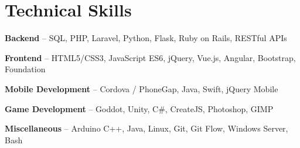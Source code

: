 \section{Technical Skills}
\begin{small}
	\parbox[t][][t]{\linewidth}{
		\textbf{Backend} -- SQL, PHP, Laravel, Python, Flask, Ruby on Rails, RESTful APIs
		\smallbreak
	}
	\parbox[t][][t]{\linewidth}{
	\textbf{Frontend} -- HTML5/CSS3, JavaScript ES6, jQuery, Vue.js, Angular, Bootstrap, Foundation
	\smallbreak
}
	\parbox[t][][t]{\linewidth}{
		\textbf{Mobile Development} -- Cordova / PhoneGap, Java, Swift, jQuery Mobile
		\smallbreak
	}
	\parbox[t][][t]{\linewidth}{
		\textbf{Game Development} -- Goddot, Unity, C\#, CreateJS, Photoshop, GIMP
		\smallbreak
	}
	\parbox[t][][t]{\linewidth}{
	\textbf{Miscellaneous} -- Arduino C++, Java, Linux, Git, Git Flow, Windows Server, Bash
}
\end{small}
